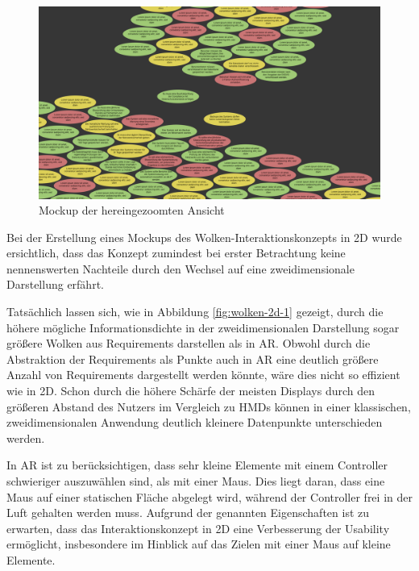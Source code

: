\begin{figure}[H]
    \centering
    \includegraphics[width=1\textwidth]{images/FigmaWolkenCloseup.png}
    \caption{Mockup der hereingezoomten Ansicht}
    \label{fig:wolken-2d-2}
\end{figure}

Bei der Erstellung eines Mockups des Wolken-Interaktionskonzepts in 2D wurde ersichtlich, dass das Konzept zumindest bei erster Betrachtung keine nennenswerten Nachteile durch den Wechsel auf eine zweidimensionale Darstellung erfährt.

Tatsächlich lassen sich, wie in Abbildung \ref{fig:wolken-2d-1} gezeigt, durch die höhere mögliche Informationsdichte in der zweidimensionalen Darstellung sogar größere Wolken aus Requirements darstellen als in AR.
Obwohl durch die Abstraktion der Requirements als Punkte auch in AR eine deutlich größere Anzahl von Requirements dargestellt werden könnte, wäre dies nicht so effizient wie in 2D.
Schon durch die höhere Schärfe der meisten Displays durch den größeren Abstand des Nutzers im Vergleich zu HMDs können in einer klassischen, zweidimensionalen Anwendung deutlich kleinere Datenpunkte unterschieden werden.

In AR ist zu berücksichtigen, dass sehr kleine Elemente mit einem Controller schwieriger auszuwählen sind, als mit einer Maus.
Dies liegt daran, dass eine Maus auf einer statischen Fläche abgelegt wird, während der Controller frei in der Luft gehalten werden muss.
Aufgrund der genannten Eigenschaften ist zu erwarten, dass das Interaktionskonzept in 2D eine Verbesserung der Usability ermöglicht, insbesondere im Hinblick auf das Zielen mit einer Maus auf kleine Elemente.

